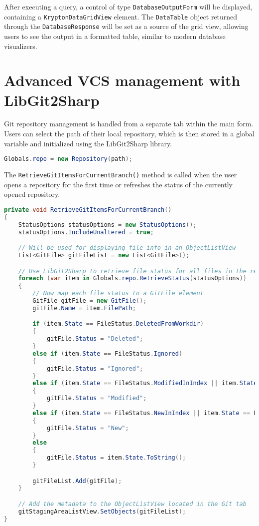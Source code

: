 After executing a query, a control of type \texttt{DatabaseOutputForm} will be displayed, containing a \texttt{KryptonDataGridView} element. The \texttt{DataTable} object returned through the \texttt{DatabaseResponse} will be set as a source of the grid view, allowing users to see the output in a formatted table, similar to modern database visualizers.

\section{Advanced VCS management with LibGit2Sharp}

Git repository management is handled from a separate tab within the main form. Users can select the path of their local repository, which is then stored in a global variable and initialized using the LibGit2Sharp library.

\begin{lstlisting}[language=csharp, caption={Using LibGit2Sharp to scan a local repository provided as a path}]
Globals.repo = new Repository(path);
\end{lstlisting}

The \texttt{RetrieveGitItemsForCurrentBranch()} method is called when the user opens a repository for the first time or refreshes the status of the currently opened repository.

\begin{lstlisting}[language=csharp, caption={The RetrieveGitItemsForCurrentBranch() method that retrieves the status of the files located inside a repository and displays them in an ObjectListView control}]
private void RetrieveGitItemsForCurrentBranch()
{
    StatusOptions statusOptions = new StatusOptions();
    statusOptions.IncludeUnaltered = true;

    // Will be used for displaying file info in an ObjectListView
    List<GitFile> gitFileList = new List<GitFile>();

    // Use LibGit2Sharp to retrieve file status for all files in the repository
    foreach (var item in Globals.repo.RetrieveStatus(statusOptions))
    {
        // Now map each file status to a GitFile element
        GitFile gitFile = new GitFile();
        gitFile.Name = item.FilePath;

        if (item.State == FileStatus.DeletedFromWorkdir)
        {
            gitFile.Status = "Deleted";
        }
        else if (item.State == FileStatus.Ignored)
        {
            gitFile.Status = "Ignored";
        }
        else if (item.State == FileStatus.ModifiedInIndex || item.State == FileStatus.ModifiedInWorkdir)
        {
            gitFile.Status = "Modified";
        }
        else if (item.State == FileStatus.NewInIndex || item.State == FileStatus.NewInWorkdir)
        {
            gitFile.Status = "New";
        }
        else
        {
            gitFile.Status = item.State.ToString();
        }

        gitFileList.Add(gitFile);
    }

    // Add the metadata to the ObjectListView located in the Git tab
    gitStagingAreaListView.SetObjects(gitFileList);
}
\end{lstlisting}

